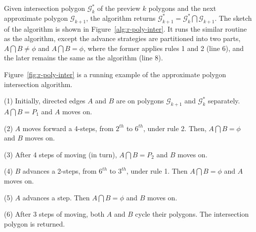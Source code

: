 Given intersection polygon $\mathcal{G}^*_k$ of the preview $k$ polygons and the next approximate polygon $\mathcal{G}_{k+1}$, the algorithm returns $\mathcal{G}^*_{k+1} = \mathcal{G}^*_k  \bigcap \mathcal{G}_{k+1}$.
The sketch of the algorithm is shown in Figure~\ref{alg:r-poly-inter}.
%
It runs the similar routine as the \cpia algorithm, except the advance strategies are partitioned into two parts, \ie $A \bigcap B \ne \phi$ and $A \bigcap B = \phi$, where the former applies rules 1 and 2 (line 6), and the later remains the same as the \cpia algorithm (line 8).








\begin{example}
Figure~\ref{fig:r-poly-inter} is a running example of the approximate polygon intersection algorithm.

\ni (1) Initially, directed edges $A$ and $B$ are on polygons $\mathcal{G}_{k+1}$ and $\mathcal{G}^*_{k}$ separately. $A \bigcap B = P_1$ and $A$ moves on.

\ni (2) $A$ moves forward a 4-steps, from $2^{th}$ to $6^{th}$, under rule 2. Then, $A \bigcap B = \phi$ and $B$ moves on.

\ni (3) After 4 steps of moving (in turn), $A \bigcap B = P_2$ and $B$ moves on.

\ni (4) $B$ advances a 2-steps, from $6^{th}$ to $3^{th}$, under rule 1. Then $A \bigcap B = \phi$ and $A$ moves on.

\ni (5) $A$ advances a step. Then $A \bigcap B = \phi$ and $B$ moves on.

\ni (6) After 3 steps of moving, both $A$ and $B$ cycle their polygons. The intersection polygon is returned.
\end{example}






